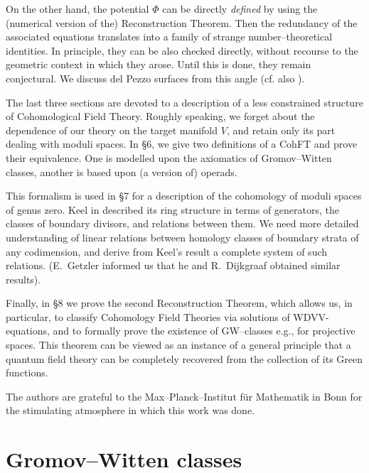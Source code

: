 \documentclass[reqno]{amsart}
\theoremstyle{definition}
\begin{document}
\smallskip

On the other hand, the potential $\Phi$ can be directly \textit{defined}
by using the (numerical version of the) Reconstruction Theorem.
Then the redundancy of the associated equations translates
into a family of strange number--theoretical identities.
In principle, they can be also checked directly, without recourse
to the geometric context in which they arose. Until this is
done, they remain conjectural. We discuss del Pezzo surfaces
from this angle (cf. also \cite{I}).

\smallskip

The last three sections are devoted to a description of a less
constrained structure of Cohomological Field Theory.
Roughly speaking, we forget about the dependence of our theory
on the target manifold $V$, and retain only its part dealing
with moduli spaces.
In \S 6, we give two definitions of a CohFT and prove their equivalence.
One is modelled upon the axiomatics of Gromov--Witten classes,
another is based upon (a version of) operads.

\smallskip

This formalism is used in \S 7 for a description of the cohomology
of moduli spaces of genus zero. Keel in \cite{Ke} described its ring
structure in terms of generators, the classes of boundary divisors,
and relations between them. We need more detailed understanding
of linear relations between homology classes of boundary strata
of any codimension, and derive from Keel's result a complete
system of such relations.
(E.~Getzler informed us that he and R.~Dijkgraaf obtained similar results).

\smallskip

Finally, in \S 8 we prove the second Reconstruction Theorem,
which allows us, in particular, to classify Cohomology
Field Theories via solutions of WDVV-equations, and to formally
prove the existence of GW--classes e.g., for projective spaces.
This theorem can be viewed as an instance of a general principle
that a quantum field theory can be completely recovered
from the collection of its Green functions.

\smallskip

The authors are grateful to the Max--Planck--Institut f\"ur
Mathematik in Bonn for the stimulating atmosphere in which
this work was done.


\section{Gromov--Witten classes}
\end{document}
